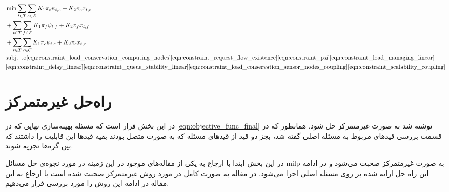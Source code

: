 	\begin{align}
		&\min \sum_{t \in T}\sum_{e \in E} K_1\pi_e\psi_{t,e}+K_2\pi_ex_{t,e}\notag \\
		&+\sum_{t \in T}\sum_{f \in F} K_1\pi_f\psi_{t,f}+K_2\pi_fx_{t,f}\notag \\
		&+\sum_{t \in T}\sum_{c \in C} K_1\pi_c\psi_{t,c}+K_2\pi_cx_{t,c} \label{eqn:objective_func_final} \notag \\
		&\text{subj. to}  %
		\cref{eqn:constraint_load_conservation_computing_nodes}
		\cref{eqn:constraint_request_flow_existence}\cref{eqn:constraint_psi}
		\cref{eqn:constraint_load_managing_linear} \notag \\
		&\cref{eqn:constraint_delay_linear}
		\cref{eqn:constraint_queue_stability_linear}
		\cref{eqn:constraint_load_conservation_sensor_nodes_coupling}
		\cref{eqn:constraint_scalability_coupling}
	\end{align}
	\section{راه‌حل غیرمتمرکز}
	در این بخش قرار است که مسئله بهینه‌سازی نهایی که در \cref{eqn:objective_func_final} نوشته شد به صورت غیرمتمرکز حل شود. 
	همانطور که در قسمت بررسی قیدهای مربوط به مسئله اصلی گفته شد، بجز دو قید از قیدهای مسئله که به صورت متصل بودند بقیه قیدها این قابلیت را داشتند که بین گره‌ها تجزیه شوند. 
	
	در این بخش ابتدا با ارچاع به یکی از مقاله‌های موجود در این زمینه در مورد نجوه‌ی حل مسائل milp به صورت غیرمتمرکز صحبت می‌شود و در ادامه این راه حل ارائه شده بر روی مسئله اصلی اجرا می‌شود. 
	در مقاله \cite{decentralized_approach} به صورت کامل در مورد روش غیرمتمرکز صحبت شده است با ارجاع به این مقاله در ادامه این روش را مورد بررسی قرار می‌دهیم. 
	
